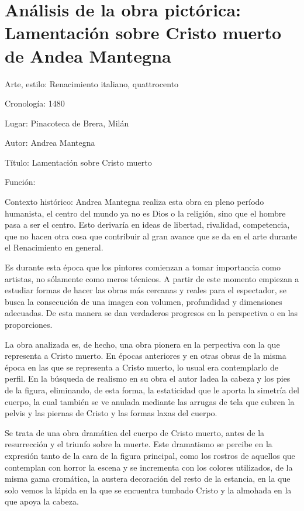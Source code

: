 \section{Análisis de la obra pictórica: Lamentación sobre Cristo muerto de Andea Mantegna}

Arte, estilo: Renacimiento italiano, quattrocento

Cronología: 1480

Lugar: Pinacoteca de Brera, Milán

Autor: Andrea Mantegna

Título: Lamentación sobre Cristo muerto

Función:

Contexto histórico: Andrea Mantegna realiza esta obra en pleno período humanista, el centro del mundo ya no es Dios o la religión, sino que el hombre pasa a ser el centro. Esto derivaría en ideas de libertad, rivalidad, competencia, que no hacen otra cosa que contribuir al gran avance que se da en el arte durante el Renacimiento en general.

Es durante esta época que los pintores comienzan a tomar importancia como artistas, no sólamente como meros técnicos. A partir de este momento empiezan a estudiar formas de hacer las obras más cercanas y reales para el espectador, se busca la consecución de una imagen con volumen, profundidad y dimensiones adecuadas. De esta manera se dan verdaderos progresos en la perspectiva o en las proporciones.

La obra analizada es, de hecho, una obra pionera en la perpectiva con la que representa a Cristo muerto. En épocas anteriores y en otras obras de la misma época en las que se representa a Cristo muerto, lo usual era contemplarlo de perfil. En la búsqueda de realismo en su obra el autor ladea la cabeza y los pies de la figura, eliminando, de esta forma, la estaticidad que le aporta la simetría del cuerpo, la cual también se ve anulada mediante las arrugas de tela que cubren la pelvis y las piernas de Cristo y las formas laxas del cuerpo.

Se trata de una obra dramática del cuerpo de Cristo muerto, antes de la resurrección y el triunfo sobre la muerte. Este dramatismo se percibe en la expresión tanto de la cara de la figura principal, como los rostros de aquellos que contemplan con horror la escena y se incrementa con los colores utilizados, de la misma gama cromática, la austera decoración del resto de la estancia, en la que solo vemos la lápida en la que se encuentra tumbado Cristo y la almohada en la que apoya la cabeza.

